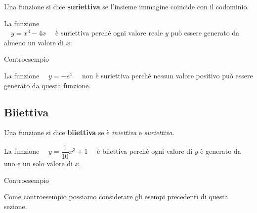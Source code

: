 \begin{definizione}
Una funzione si dice \textbf{suriettiva} se l'insieme immagine coincide con 
il codominio.
\end{definizione}

\begin{minipage}{.45\textwidth}
\begin{esempio}

La funzione\\
\(\quad y= x^3 -4x \quad\) è suriettiva perché ogni valore reale 
\(y\) può essere generato da almeno un valore di \(x\):
\begin{center}
\end{center}
\end{esempio}
\end{minipage}
\hfill
\begin{minipage}{.45\textwidth}
\begin{esempio}Controesempio

La funzione \(\quad y = - e^x \quad\) non è suriettiva perché nessun valore 
positivo può essere generato da questa funzione.
\end{esempio}
\begin{center}
\end{center}
\end{minipage}

\subsection{Biiettiva}

\begin{definizione}
Una funzione si dice \textbf{biiettiva} se è \emph{iniettiva} e 
\emph{suriettiva}.
\end{definizione}

\begin{minipage}{.49\textwidth}
\begin{esempio}

La funzione \(\quad y = \dfrac{1}{10}x^3+1 \quad\) è biiettiva perché ogni 
valore di \(y\) è 
generato da uno e un solo valore di \(x\).
\end{esempio}
\begin{esempio}Controesempio

Come controesempio possiamo considerare gli esempi precedenti di questa 
sezione.
\end{esempio}
\end{minipage}
\hfill
\begin{minipage}{.49\textwidth}
\begin{center}
\end{center}
\end{minipage}

